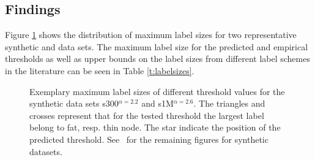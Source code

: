 \subsection{Findings}
Figure \ref{fig:findings} shows the distribution of maximum label sizes for two representative synthetic and  data sets. The maximum label size
for the predicted and empirical thresholds as well as upper bounds on the label sizes from different label schemes in the literature can be seen in Table \ref{t:labelsizes}. 

\begin{figure}[!ht]
\centering
{}\hspace*{-2.5em}
%
\caption{Exemplary maximum label sizes of different threshold values for the synthetic data sets   s300$^{\alpha=2.2}$ and s1M$^{\alpha=2.6}$. 
The triangles and crosses represent that for the tested threshold the largest label belong to fat, resp. thin node. The star indicate the position of the predicted threshold.
See~\cite{} for the remaining  figures for synthetic datasets.}
\label{fig:findings}%
\end{figure}




